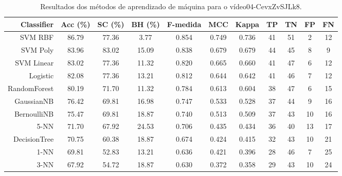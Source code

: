 \begin{table}[!htb]
\centering
\caption{Resultados dos métodos de aprendizado de máquina para o vídeo04-CevxZvSJLk8.}
\label{tab:04-CevxZvSJLk8}
\begin{tabular}{r|c|c|c|c|c|c|c|c|c|c}
\hline\hline
Classifier & Acc (\%) & SC (\%) & BH (\%) & F-medida & MCC & Kappa & TP & TN & FP & FN \\ \hline
SVM RBF & 86.79 & 77.36 & 3.77 & 0.854 & 0.749 & 0.736 & 41 & 51 & 2 & 12 \\ 
SVM Poly & 83.96 & 83.02 & 15.09 & 0.838 & 0.679 & 0.679 & 44 & 45 & 8 & 9 \\ 
SVM Linear & 83.02 & 77.36 & 11.32 & 0.820 & 0.665 & 0.660 & 41 & 47 & 6 & 12 \\ 
Logistic & 82.08 & 77.36 & 13.21 & 0.812 & 0.644 & 0.642 & 41 & 46 & 7 & 12 \\ 
RandomForest & 80.19 & 71.70 & 11.32 & 0.784 & 0.613 & 0.604 & 38 & 47 & 6 & 15 \\ 
GaussianNB & 76.42 & 69.81 & 16.98 & 0.747 & 0.533 & 0.528 & 37 & 44 & 9 & 16 \\ 
BernoulliNB & 75.47 & 69.81 & 18.87 & 0.740 & 0.513 & 0.509 & 37 & 43 & 10 & 16 \\ 
5-NN & 71.70 & 67.92 & 24.53 & 0.706 & 0.435 & 0.434 & 36 & 40 & 13 & 17 \\ 
DecisionTree & 70.75 & 60.38 & 18.87 & 0.674 & 0.424 & 0.415 & 32 & 43 & 10 & 21 \\ 
1-NN & 69.81 & 52.83 & 13.21 & 0.636 & 0.421 & 0.396 & 28 & 46 & 7 & 25 \\ 
3-NN & 67.92 & 54.72 & 18.87 & 0.630 & 0.372 & 0.358 & 29 & 43 & 10 & 24 \\ 
\hline\hline
\end{tabular}
\end{table}
